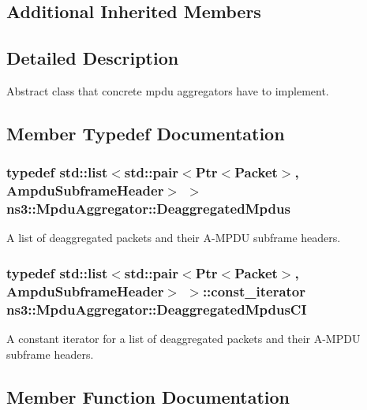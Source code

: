 \subsection*{Additional Inherited Members}


\subsection{Detailed Description}
Abstract class that concrete mpdu aggregators have to implement. 

\subsection{Member Typedef Documentation}
\subsubsection[{\texorpdfstring{Deaggregated\+Mpdus}{DeaggregatedMpdus}}]{\setlength{\rightskip}{0pt plus 5cm}typedef {\bf std\+::list}$<$std\+::pair$<${\bf Ptr}$<${\bf Packet}$>$, {\bf Ampdu\+Subframe\+Header}$>$ $>$ {\bf ns3\+::\+Mpdu\+Aggregator\+::\+Deaggregated\+Mpdus}}\hypertarget{classns3_1_1MpduAggregator_a09f3b03cb988045c381fad4ba4dce371}{}\label{classns3_1_1MpduAggregator_a09f3b03cb988045c381fad4ba4dce371}
A list of deaggregated packets and their A-\/\+M\+P\+DU subframe headers. 
\subsubsection[{\texorpdfstring{Deaggregated\+Mpdus\+CI}{DeaggregatedMpdusCI}}]{\setlength{\rightskip}{0pt plus 5cm}typedef {\bf std\+::list}$<$std\+::pair$<${\bf Ptr}$<${\bf Packet}$>$, {\bf Ampdu\+Subframe\+Header}$>$ $>$\+::const\+\_\+iterator {\bf ns3\+::\+Mpdu\+Aggregator\+::\+Deaggregated\+Mpdus\+CI}}\hypertarget{classns3_1_1MpduAggregator_a14d8750e18f3104d3c87930f3bcb10a3}{}\label{classns3_1_1MpduAggregator_a14d8750e18f3104d3c87930f3bcb10a3}
A constant iterator for a list of deaggregated packets and their A-\/\+M\+P\+DU subframe headers. 

\subsection{Member Function Documentation}
